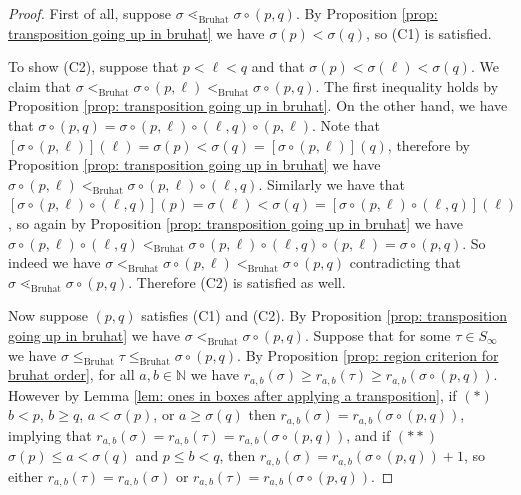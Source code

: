 \documentclass[10pt,a4paper]{amsart}
\newcommand{\nn}{\ensuremath{\mathbb{N}}}
\begin{document}
\begin{proof}
First of all, suppose $\sigma \lessdot_\text{Bruhat} \sigma \circ (p , q)$. By Proposition \ref{prop: transposition going up in bruhat} we have $\sigma(p) < \sigma(q)$, so (C1) is satisfied. 

To show (C2), suppose that $p < \ell < q$ and that $\sigma(p) < \sigma(\ell) < \sigma(q)$. We claim that $\sigma <_\text{Bruhat} \sigma \circ (p , \ell) <_\text{Bruhat} \sigma \circ (p , q)$. The first inequality holds by Proposition \ref{prop: transposition going up in bruhat}. On the other hand, we have that $\sigma \circ (p , q) = \sigma \circ (p , \ell) \circ (\ell , q) \circ (p , \ell)$. Note that $[\sigma \circ (p , \ell)](\ell) = \sigma(p) < \sigma(q) = [\sigma \circ (p , \ell)](q)$, therefore by Proposition \ref{prop: transposition going up in bruhat} we have $\sigma \circ (p , \ell) <_\text{Bruhat} \sigma \circ (p , \ell) \circ (\ell , q)$. Similarly we have that $[\sigma \circ (p , \ell) \circ (\ell , q)](p) = \sigma(\ell) < \sigma(q) = [\sigma \circ (p , \ell) \circ (\ell , q)](\ell)$, so again by Proposition \ref{prop: transposition going up in bruhat} we have $\sigma \circ (p , \ell) \circ (\ell , q) <_\text{Bruhat} \sigma \circ (p , \ell) \circ (\ell , q) \circ (p , \ell) = \sigma \circ (p , q)$. So indeed we have $\sigma <_\text{Bruhat} \sigma \circ (p , \ell) <_\text{Bruhat} \sigma \circ (p , q)$ contradicting that $\sigma \lessdot_\text{Bruhat} \sigma \circ (p , q)$. Therefore (C2) is satisfied as well.

Now suppose $(p , q)$ satisfies (C1) and (C2). By Proposition \ref{prop: transposition going up in bruhat} we have $\sigma <_\text{Bruhat} \sigma \circ (p , q)$. Suppose that for some $\tau \in S_\infty$ we have $\sigma \leq_\text{Bruhat} \tau \leq_\text{Bruhat} \sigma \circ (p , q)$. By Proposition \ref{prop: region criterion for bruhat order}, for all $a , b \in \nn$ we have $r_{a , b}(\sigma) \geq r_{a , b}(\tau) \geq r_{a , b}(\sigma \circ (p , q))$. However by Lemma \ref{lem: ones in boxes after applying a transposition}, if $(\ast)$ $b < p$, $b \geq q$, $a < \sigma(p)$, or $a \geq \sigma(q)$ then $r_{a , b}(\sigma) = r_{ a , b}(\sigma \circ (p , q))$, implying that $r_{a , b}(\sigma) = r_{a , b}(\tau) = r_{ a , b}(\sigma \circ (p , q))$, and if $(\ast \ast)$ $\sigma(p) \leq a < \sigma(q)$ and $p \leq b < q$, then $r_{a , b}(\sigma) = r_{a , b}(\sigma \circ (p , q)) + 1$, so either $r_{a , b}(\tau) = r_{a , b}(\sigma)$ or $r_{a , b}(\tau) = r_{ a , b}(\sigma \circ (p , q))$.


\end{proof}
\end{document}
